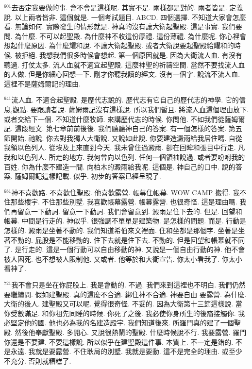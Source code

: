\documentclass{book}
\begin{document}
$^{601}$去否定我要做的事.
會不會是這樣呢.
其實不是.
兩樣都是對的.
兩者皆是.
定義說.
以上兩者皆非.
這個就是.
一個考試題目.
ABCD.
四個選擇.
不知道大家會怎麼看.
無論如何.
實際發生的情形就是.
神真的沒有讓大衛起聖殿.
這是事實.
我們要問.
為什麼.
不可以起聖殿.
為什麼神不收這份厚禮.
這份薄禮.
為什麼呢.
你心裡會想起什麼原因.
為什麼耀和說.
不讓大衛起聖殿.
或者大衛說要起聖殿給耀和的時候.
被拒絕.
我想我們很多時候會想起.
第一個原因就是.
因為大衛流人血.
有沒有聽過.
打仗太多.
流人血就不適宜起聖殿.
這麼神聖的祈禱空間.
當然不要找流人血的人做.
但是你細心回想一下.
剛才你聽我讀的經文.
沒有一個字.
說流不流人血.
這裡不是薩姆爾記的理由.

$^{641}$流人血.
不適合起聖殿.
是歷代志說的.
歷代志有它自己的歷代志的神學.
它的信息,觀點.
要跟讀者說.
薩姆爾記沒有這樣說.
所以我們暫且.
將流人血這個理由放下.
或者交給下一個.
不知道什麼牧師.
來講歷代志的時候.
你問他.
不如我們從薩姆爾記.
這段經文.
第七章前前後後.
我們聽聽神自己的答案.
有一個怎樣的答案.
第五節開始.
祂說.
你去對我獨人大衛說.
又說如此說.
你要建造澱雨給我居住嗎.
自從我領以色列人.
從埃及上來直到今天.
我未曾住過澱雨.
卻在回眸和張目中行走.
凡我和以色列人.
所走的地方.
我何曾向以色列.
任何一個領袖說過.
或者要吩咐我的百姓.
你為什麼不建造一間.
向柏木的澱雨給我呢.
這個是.
神自己的口中.
說的答案.
薩姆爾記這樣記載.
似乎.
初步的答案已經呈現了.

$^{681}$神不喜歡路.
不喜歡住聖殿.
他喜歡露營.
帳幕住帳幕.
WOW CAMP 搬得.
我不住那些樓宇.
不住那些別墅.
我喜歡帳幕露營.
帳幕露營.
也很奇怪.
這是理由嗎.
我們再留意一下動詞.
留意一下動詞.
我們會留意到.
澱雨是住下去的.
但是.
回望和帳幕.
中間是行走的.
神似乎.
很強調不單單是建築物.
是怎樣的問題.
而是.
行動是怎樣的.
澱雨是坐著不動的.
我們知道希伯來文裡面.
住和坐都是那個字.
坐著是坐著不動的.
屁股是不能移動的.
住下去就是住下去.
不動的.
但是回望和帳幕就不同了.
是行走的.
這是一個行動可以自由移動的神.
又說是一個自由行動的神.
他不會被人困死.
也不想被人限制他.
又或者.
他等於和大衛宣告.
你太小看我了.
你太小看神了.

$^{721}$我不會只是坐在你屁股上.
我是會動的.
不過.
我們來到這裡也不明白.
我們仍然要繼續問.
假如建聖殿.
真的這麼不合適.
綁住神不合適.
神要自由 要露營.
為什麼.
大衛的後人.
建聖殿又可以呢.
覺得很奇怪.
不妥的.
因為大衛第十三節這樣說.
當你受數滿足.
和你祖先同睡的時候.
你死了之後.
我必使你身所生的後裔接觸你.
我必堅定他的國.
他也必為我的名建造殿宇.
我們知道後來.
所羅門真的建了一個聖殿.
然後他奉獻聖殿.
多開心.
又說很熱鬧的聖殿.
什麼時候說不行.
我要露營.
羅門你還是不要建.
不要這樣說.
所以似乎在建聖殿這件事.
本質上.
不一定是錯的.
不是永遠.
我就是要露營.
不住耿局的別墅.
我就是要動.
這不是完全的理由.
或至少不充分.
否則就糟糕了.
\end{document}
